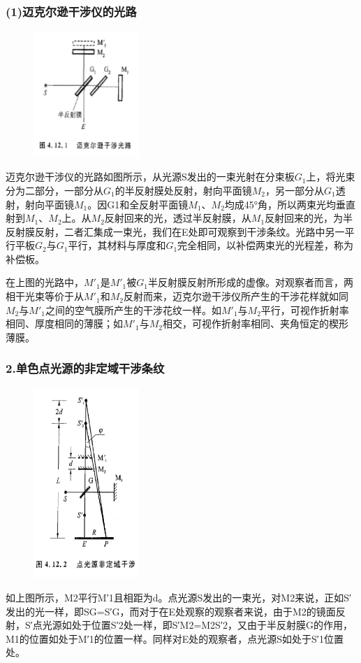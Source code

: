 \documentclass[11pt,a4paper,oneside]{article}
\begin{document}
\subsubsection*{(1)迈克尔逊干涉仪的光路}
\begin{figure}[H]
 \centering
  \includegraphics[width=4cm]{Image/迈克尔逊干涉光路.png}
\end{figure}
迈克尔逊干涉仪的光路如图所示，从光源S发出的一束光射在分束板$G_1$上，将光束分为二部分，一部分从$G_1$的半反射膜处反射，射向平面镜$M_2$，另一部分从$G_1$透射，射向平面镜$M_1$。因G1和全反射平面镜$M_1$、$M_2$均成45°角，所以两束光均垂直射到$M_1$、$M_2$上。从$M_2$反射回来的光，透过半反射膜，从$M_1$反射回来的光，为半反射膜反射，二者汇集成一束光，我们在E处即可观察到干涉条纹。光路中另一平行平板$G_2$与$G_1$平行，其材料与厚度和$G_1$完全相同，以补偿两束光的光程差，称为补偿板。

在上图的光路中，$M'_1$是$M'_1$被$G_1$半反射膜反射所形成的虚像。对观察者而言，两相干光束等价于从$M'_1$和$M_2$反射而来，迈克尔逊干涉仪所产生的干涉花样就如同$M_2$与$M'_1$之间的空气膜所产生的干涉花纹一样。如$M'_1$与$M_2$平行，可视作折射率相同、厚度相同的薄膜；如$M'_1$与$M_2$相交，可视作折射率相同、夹角恒定的楔形薄膜。

\subsubsection*{2.单色点光源的非定域干涉条纹}
\begin{figure}[htbp]
 \centering
  \includegraphics[width=4cm]{Image/点光源非定域干涉.png}
\end{figure}
如上图所示，M2平行M′1且相距为d。点光源S发出的一束光，对M2来说，正如S′发出的光一样，即SG=S′G，而对于在E处观察的观察者来说，由于M2的镜面反射，S′点光源如处于位置S′2处一样，即S′M2=M2S′2，又由于半反射膜G的作用，M1的位置如处于M′1的位置一样。同样对E处的观察者，点光源S如处于S′1位置处。
\end{document}
